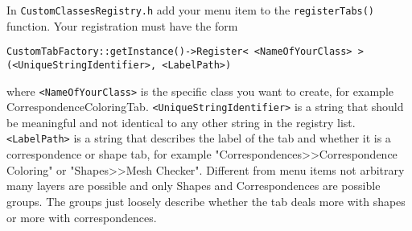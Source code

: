 In \texttt{CustomClassesRegistry.h} add your menu item to the \texttt{registerTabs()} function. Your registration must have the form
 
\texttt{CustomTabFactory::getInstance()->Register< <NameOfYourClass> > \linebreak
	\hspace*{2ex}(<UniqueStringIdentifier>, <LabelPath>)}

where \texttt{<NameOfYourClass>} is the specific class you want to create, for example CorrespondenceColoringTab. \texttt{<UniqueStringIdentifier>} is a string that should be meaningful and not identical to any other string in the registry list. \texttt{<LabelPath>} is a string that describes the label of the tab and whether it is a correspondence or shape tab, for example "Correspondences>>Correspondence Coloring" or "Shapes>>Mesh Checker". Different from menu items not arbitrary many layers are possible and only Shapes and Correspondences are possible groups. The groups just loosely describe whether the tab deals more with shapes or more with correspondences.